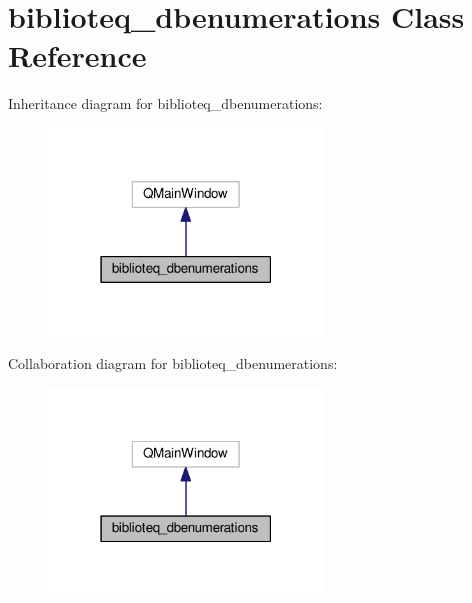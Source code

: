 \hypertarget{classbiblioteq__dbenumerations}{}\section{biblioteq\+\_\+dbenumerations Class Reference}
\label{classbiblioteq__dbenumerations}


Inheritance diagram for biblioteq\+\_\+dbenumerations\+:
\nopagebreak
\begin{figure}[H]
\begin{center}
\leavevmode
\includegraphics[width=207pt]{classbiblioteq__dbenumerations__inherit__graph}
\end{center}
\end{figure}


Collaboration diagram for biblioteq\+\_\+dbenumerations\+:
\nopagebreak
\begin{figure}[H]
\begin{center}
\leavevmode
\includegraphics[width=207pt]{classbiblioteq__dbenumerations__coll__graph}
\end{center}
\end{figure}
